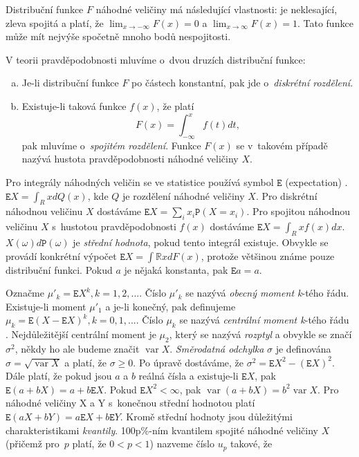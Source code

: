 \documentclass[thesis=B,czech]{FITthesis}[2012/06/26]
\DeclareMathOperator{\var}{var}						%
\begin{document}
Distribuční funkce $F$ náhodné veličiny má následující vlastnosti: je neklesající, zleva spojitá a platí, že $\lim_{x\rightarrow-\infty} F(x) =0$ a $\lim_{x\rightarrow\infty} F(x) =1$. Tato funkce může mít nejvýše spočetně mnoho bodů nespojitosti.

V teorii pravděpodobnosti mluvíme o~dvou druzích distribuční funkce:

\begin{enumerate}[(a)]
\item Je-li distribuční funkce $F$ po částech konstantní, pak jde o~\textit{diskrétní rozdělení}.

\item Existuje-li taková funkce $f(x)$, že platí
$$F(x) =  \int_{-\infty}^{x}f(t)dt,$$
pak mluvíme o~\textit{spojitém rozdělení}. Funkce $F(x)$ se v~takovém případě nazývá hustota pravděpodobnosti náhodné veličiny $X$.
\end{enumerate}

Pro integrály náhodných veličin se ve statistice používá symbol $\mathtt{E}$ (expectation) \cite{Anděl}. $\mathtt{E}X = \int_R x dQ(x)$, kde $Q$ je rozdělení náhodné veličiny $X$. Pro diskrétní náhodnou veličinu $X$ dostáváme $\mathtt{E}X = \sum_i x_i \mathtt{P}(X=x_i)$. Pro spojitou náhodnou veličinu $X$ s~hustotou pravděpodobnosti $f(x)$ dostáváme $\mathtt{E}X = \int_R x f(x) dx$. $X(\omega)d\mathtt{P}(\omega)$ je \textit{střední hodnota}, pokud tento integrál existuje. Obvykle se provádí konkrétní výpočet $\mathtt{E}X=\int{\mathbb{R}} xdF(x)$, protože většinou známe pouze distribuční funkci. Pokud $a$ je nějaká konstanta, pak $\mathtt{E}a=a$. 

Označme ${\mu}'_{k}=\mathtt{E}X^k, k=1,2,...$. Číslo ${\mu}'_{k}$ se nazývá \textit{obecný moment k}-tého řádu. Existuje-li moment ${\mu}'_{1}$ a je-li konečný, pak definujeme $\mu_{k}=\mathtt{E}(X-\mathtt{E}X)^k, k=0,1,...$. Číslo $\mu_{k}$ se nazývá \textit{centrální moment k}-tého řádu \cite{Anděl}. Nejdůležitější centrální moment je $\mu_{2}$, který se nazývá \textit{rozptyl} a obvykle se značí $\sigma^2$, někdy ho ale budeme značit $\var X$. \textit{Směrodatná odchylka} $\sigma$ je definována $\sigma=\sqrt{\var X}$ a platí, že $\sigma\geq 0$. Po úpravě dostáváme, že $\sigma^2 = \mathtt{E}X^2 - (\mathtt{E}X)^2$. Dále platí, že pokud jsou $a$ a $b$ reálná čísla a existuje-li $\mathtt{E}X$, pak $\mathtt{E}(a+bX)=a+b\mathtt{E}X$. Pokud $\mathtt{E}X^2<\infty$, pak $\var(a+bX)=b^2\var X$. Pro náhodné veličiny X a Y s~konečnou střední hodnotou platí $\mathtt{E}(aX+bY)=a\mathtt{E}X+b\mathtt{E}Y$. Kromě střední hodnoty jsou důležitými charakteristikami \textit{kvantily}. 100p\%-ním kvantilem spojité náhodné veličiny $X$ (přičemž pro~$p$ platí, že $0<p<1$) nazveme číslo $u_{p}$ takové, že
\end{document}
